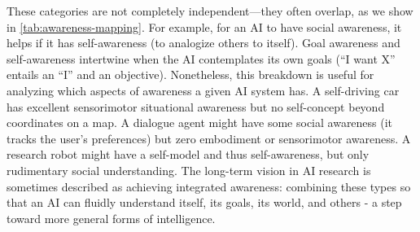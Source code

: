 These categories are not completely independent—they often overlap, as we show in \autoref{tab:awareness-mapping}. For example, for an AI to have social awareness, it helps if it has self-awareness (to analogize others to itself). Goal awareness and self-awareness intertwine when the AI contemplates its own goals (``I want X'' entails an ``I'' and an objective). Nonetheless, this breakdown is useful for analyzing which aspects of awareness a given AI system has. A self-driving car has excellent sensorimotor situational awareness but no self-concept beyond coordinates on a map. A dialogue agent might have some social awareness (it tracks the user's preferences) but zero embodiment or sensorimotor awareness. A research robot might have a self-model and thus self-awareness, but only rudimentary social understanding. The long-term vision in AI research is sometimes described as achieving integrated awareness: combining these types so that an AI can fluidly understand itself, its goals, its world, and others - a step toward more general forms of intelligence.

